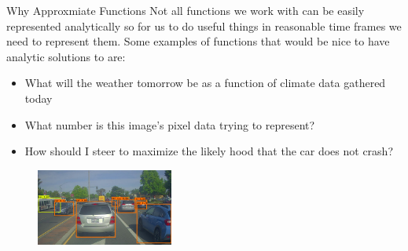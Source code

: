 \documentclass[aspectratio=169, 10pt]{beamer} %
\begin{document}
\begin{frame}{Why Approxmiate Functions}
  Not all functions we work with can be easily represented analytically so for us to do useful things in reasonable time frames we need to represent them. Some examples of functions that would be nice to have analytic solutions to are: \begin{itemize}
      \item What will the weather tomorrow be as a function of climate data gathered today
    \item What number is this image's pixel data trying to represent?
    \item How should I steer to maximize the likely hood that the car does not crash?
    \end{itemize}
\begin{figure}
            \centering
    \includegraphics[width=0.4\textwidth]{./yolo_Ex.jpg}
    \end{figure}\end{frame}
     
\end{document}
